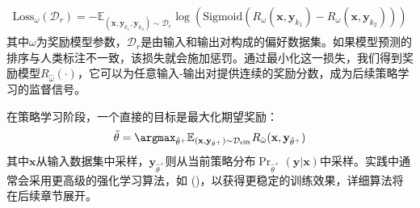 \begin{eqnarray}
\mathrm{Loss}_{\omega}(\mathcal{D}_r) = -\mathbb{E}_{(\mathbf{x},\mathbf{y}_{k_1},\mathbf{y}_{k_2}) \sim \mathcal{D}_r} \log(\mathrm{Sigmoid}(R_{\omega}(\mathbf{x},\mathbf{y}_{k_1}) - R_{\omega}(\mathbf{x},\mathbf{y}_{k_2})))
\end{eqnarray}
其中$\omega$为奖励模型参数，$\mathcal{D}_r$是由输入和输出对构成的偏好数据集。如果模型预测的排序与人类标注不一致，该损失就会施加惩罚。通过最小化这一损失，我们得到奖励模型$R_{\hat{\omega}}(\cdot)$，它可以为任意输入-输出对提供连续的奖励分数，成为后续策略学习的监督信号。

在策略学习阶段，一个直接的目标是最大化期望奖励：
\begin{eqnarray}
\tilde{\theta} = \argmax_{\hat{\theta}^+} \mathbb{E}_{(\mathbf{x},\mathbf{y}_{\hat{\theta}^+}) \sim \mathcal{D}_{\mathrm{rlft}}} R_{\hat{\omega}}(\mathbf{x},\mathbf{y}_{\hat{\theta}^+})
\end{eqnarray}
其中$\mathbf{x}$从输入数据集中采样，$\mathbf{y}_{\hat{\theta}^+}$则从当前策略分布$\Pr_{\hat{\theta}^+}(\mathbf{y}|\mathbf{x})$中采样。实践中通常会采用更高级的强化学习算法，如 ()，以获得更稳定的训练效果，详细算法将在后续章节展开。





